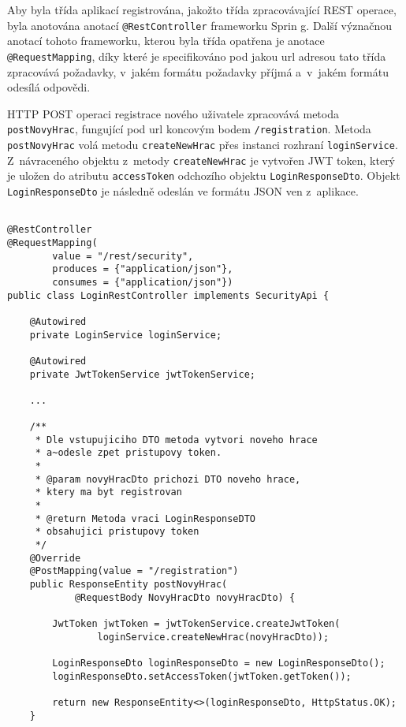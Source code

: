 \documentclass[12pt]{article}
\begin{document}
{Aby byla třída aplikací registrována, jakožto třída zpracovávající REST operace,
byla anotována anotací \texttt{@RestController} frameworku Sprin
g. Další význačnou anotací tohoto frameworku, kterou byla třída opatřena je anotace\texttt{ @RequestMapping},
díky které je specifikováno pod jakou url adresou tato třída zpracovává požadavky,
v~jakém formátu požadavky příjmá a~v~jakém formátu odesílá odpovědi.

HTTP POST operaci registrace nového uživatele zpracovává metoda \texttt{postNovyHrac},
fungující pod url koncovým bodem \texttt{/registration}.
Metoda \texttt{postNovyHrac} volá metodu \texttt{createNewHrac} přes instanci rozhraní \texttt{loginService}.
Z~návraceného objektu z~metody \texttt{createNewHrac} je vytvořen JWT token,
který je uložen do atributu \texttt{accessToken} odchozího objektu \texttt{LoginResponseDto}.
Objekt \texttt{LoginResponseDto} je následně odeslán ve formátu JSON ven z~aplikace.

\clearpage

\begin{lstlisting}

@RestController
@RequestMapping(
        value = "/rest/security",
        produces = {"application/json"},
        consumes = {"application/json"})
public class LoginRestController implements SecurityApi {
    
    @Autowired
    private LoginService loginService;
    
    @Autowired
    private JwtTokenService jwtTokenService;
    
    ...

    /**
     * Dle vstupujiciho DTO metoda vytvori noveho hrace
     * a~odesle zpet pristupovy token.
     *
     * @param novyHracDto prichozi DTO noveho hrace,
     * ktery ma byt registrovan
     *                    
     * @return Metoda vraci LoginResponseDTO
     * obsahujici pristupovy token
     */
    @Override
    @PostMapping(value = "/registration")
    public ResponseEntity postNovyHrac(
            @RequestBody NovyHracDto novyHracDto) {
             
        JwtToken jwtToken = jwtTokenService.createJwtToken(
                loginService.createNewHrac(novyHracDto));
                
        LoginResponseDto loginResponseDto = new LoginResponseDto();
        loginResponseDto.setAccessToken(jwtToken.getToken());

        return new ResponseEntity<>(loginResponseDto, HttpStatus.OK);      
    }
    

\end{lstlisting}}
\end{document}
